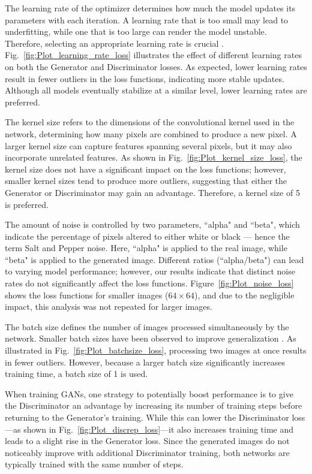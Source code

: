 The learning rate of the optimizer determines how much the model updates its parameters with each iteration. A learning rate that is too small may lead to underfitting, while one that is too large can render the model unstable. Therefore, selecting an appropriate learning rate is crucial \citep{murphy2022probabilistic}. Fig.~\ref{fig:Plot_learning_rate_loss} illustrates the effect of different learning rates on both the Generator and Discriminator losses. As expected, lower learning rates result in fewer outliers in the loss functions, indicating more stable updates. Although all models eventually stabilize at a similar level, lower learning rates are preferred.

The kernel size refers to the dimensions of the convolutional kernel used in the network, determining how many pixels are combined to produce a new pixel. A larger kernel size can capture features spanning several pixels, but it may also incorporate unrelated features. As shown in Fig.~\ref{fig:Plot_kernel_size_loss}, the kernel size does not have a significant impact on the loss functions; however, smaller kernel sizes tend to produce more outliers, suggesting that either the Generator or Discriminator may gain an advantage. Therefore, a kernel size of 5 is preferred.

The amount of noise is controlled by two parameters, ``alpha" and ``beta", which indicate the percentage of pixels altered to either white or black — hence the term Salt and Pepper noise. Here, ``alpha" is applied to the real image, while ``beta" is applied to the generated image. Different ratios (``alpha/beta") can lead to varying model performance; however, our results indicate that distinct noise rates do not significantly affect the loss functions. Figure~\ref{fig:Plot_noise_loss} shows the loss functions for smaller images ($64 \times 64$), and due to the negligible impact, this analysis was not repeated for larger images.

The batch size defines the number of images processed simultaneously by the network. Smaller batch sizes have been observed to improve generalization \citep{prince2023understanding}. As illustrated in Fig.~\ref{fig:Plot_batchsize_loss}, processing two images at once results in fewer outliers. However, because a larger batch size significantly increases training time, a batch size of 1 is used.

When training GANs, one strategy to potentially boost performance is to give the Discriminator an advantage by increasing its number of training steps before returning to the Generator's training. While this can lower the Discriminator loss—as shown in Fig.~\ref{fig:Plot_discrep_loss}—it also increases training time and leads to a slight rise in the Generator loss. Since the generated images do not noticeably improve with additional Discriminator training, both networks are typically trained with the same number of steps.


